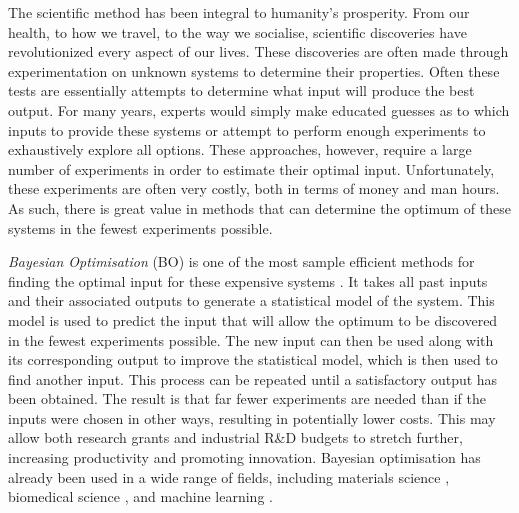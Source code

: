 \documentclass[preprint]{elsarticle}
\begin{document}
The scientific method has been integral to humanity's prosperity.
From our health, to how we travel, to the way we socialise, scientific
discoveries have revolutionized every aspect of our lives. These discoveries
are often made through experimentation on unknown systems to determine their properties. Often these tests are essentially attempts to determine what input will produce the best output. For many years, experts would simply
make educated guesses as to which inputs to provide these systems or attempt to perform enough experiments to exhaustively explore all options. These approaches, however, require a large number of experiments in order to estimate their optimal input. Unfortunately, these experiments are often very costly, both in terms of money and man hours.
As such, there is great value in methods that can determine the optimum
of these systems in the fewest experiments possible.

\emph{Bayesian Optimisation }(BO) is one of the most sample efficient methods
for finding the optimal input for these expensive systems \citep{mockus1994application}.
It takes all past inputs and their associated outputs to generate a statistical
model of the system. This model is used to predict the input that
will allow the optimum to be discovered in the fewest experiments possible. The new input can then be used along with its corresponding output to improve the statistical model, which
is then used to find another input. This process can be repeated
until a satisfactory output has been obtained. The result is that far fewer experiments are needed than if the inputs were chosen in other ways, resulting in potentially lower costs. This may allow both research
grants and industrial R\&D budgets to stretch further, increasing
productivity and promoting innovation. Bayesian optimisation has already been used in a wide range of fields, including materials science \citep{li2017rapid,kikuchi2017bayesian,ju2017designing}, biomedical science \citep{turgeon2016cognitive,gonzalez2015bayesian}, and machine learning \citep{Snoek2012,klein2017fast,xia2017boosted}.

\end{document}
